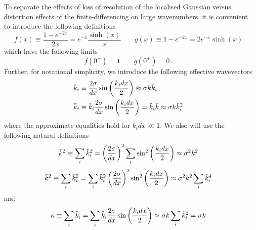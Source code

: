 \documentclass{revtex4}
\begin{document}
To separate the effects of loss of resolution of the localised Gaussian versus distortion effects of the finite-differencing on large wavenumbers, it is convenient to introduce the following definitions
\begin{equation}
  f(x) \equiv \frac{1-e^{-2x}}{2x} = e^{-x}\frac{\sinh(x)}{x} \qquad g(x) \equiv 1-e^{-2x} = 2e^{-x}\sinh(x)
\end{equation}
which have the following limits
\begin{equation}
  f(0^+) = 1 \qquad g(0^+) = 0 \, .
\end{equation}
Further, for notational simplicity, we introduce the following effective wavevectors
\begin{subequations}
\begin{align}
  \tilde{k}_i &\equiv \frac{2\sigma}{dx}\sin\left(\frac{k_idx}{2}\right) \approx \sigma k\hat{k}_i \\
  \bar{k}_i &\equiv \hat{k}_i\frac{2\sigma}{dx}\sin\left(\frac{k_idx}{2}\right) = \hat{k}_i\tilde{k} \approx \sigma k\hat{k}_i^2
\end{align}
\end{subequations}
where the approximate equalities hold for $k_idx \ll 1$.
We also will use the following natural definitions
\begin{equation}
  \tilde{k}^2 \equiv \sum_i\tilde{k}_i^2 = \left(\frac{2\sigma}{dx}\right)^2\sum_i\sin^2\left(\frac{k_idx}{2}\right) \approx \sigma^2k^2
\end{equation}
\begin{equation}
  \bar{k}^2 \equiv \sum_i\bar{k}_i^2 = \sum_i \hat{k}_i^2\left(\frac{2\sigma}{dx}\right)^2\sin^2\left(\frac{k_idx}{2}\right) \approx \sigma^2k^2\sum_i\hat{k}_i^4
\end{equation}
and
\begin{equation}
  \kappa \equiv \sum_i\bar{k}_i = \sum_i\hat{k}_i\frac{2\sigma}{dx}\sin\left(\frac{k_idx}{2}\right) \approx \sigma k\sum_i\hat{k}_i^2 = \sigma k
\end{equation}
\end{document}
